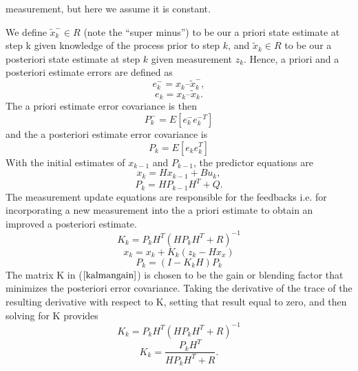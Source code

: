 \documentclass[journal]{IEEEtran}
\begin{document}
measurement, but here we assume it is constant.
\par
We define $\tilde x_k^- \in R$ (note the “super minus”) to be our a priori state estimate at step k given knowledge of the process prior to step $k$, and $\tilde x_k \in R$ to be our a posteriori state estimate at step $k$ given measurement $z_k$. Hence, a priori and a posteriori estimate errors are defined as
\begin{equation}
e_k^- = x_k – \tilde x_k^- ,
\end{equation}
\begin{equation}
e_k =  x_k – \tilde x_k.
\end{equation}
The a priori estimate error covariance is then
\begin{equation}
P_k^- = E[ e_k^- e_k^{-T} ]
\end{equation}
and the a posteriori estimate error covariance is
\begin{equation}
P_k = E[e_k e_k^T]
\end{equation}
With the initial estimates of $x_{k-1}$ and $P_{k-1}$, the predictor equations are 
\begin{equation}
x_k = Hx_{k-1} + Bu_k,
\end{equation}
\begin{equation}
P_k = HP_{k-1}H^T + Q.
\end{equation}
The measurement update equations are responsible for the feedbacks
i.e. for incorporating a new measurement into the a priori estimate
to obtain an improved a posteriori estimate.
\begin{equation}
K_k = P_kH^T(HP_kH^T + R)^{-1} \label{kalmangain}
\end{equation}
\begin{equation}
x_k = x_k + K_k(z_k - Hx_x)
\end{equation}
\begin{equation}
P_k = (I-K_kH)P_k
\end{equation}
The matrix K in ($\ref{kalmangain}$) is
chosen to be the gain or blending factor that minimizes the
posteriori error covariance. Taking the derivative of the trace of
the resulting derivative with respect to K, setting that result equal to zero, and
then solving for K provides
\begin{equation}
K_k = P_kH^{T}(HP_kH^{T} + R)^{-1}
\end{equation}
\begin{equation}
K_k = \frac{P_kH^T}{HP_kH^T + R}. \label{gain}
\end{equation}
\end{document}
